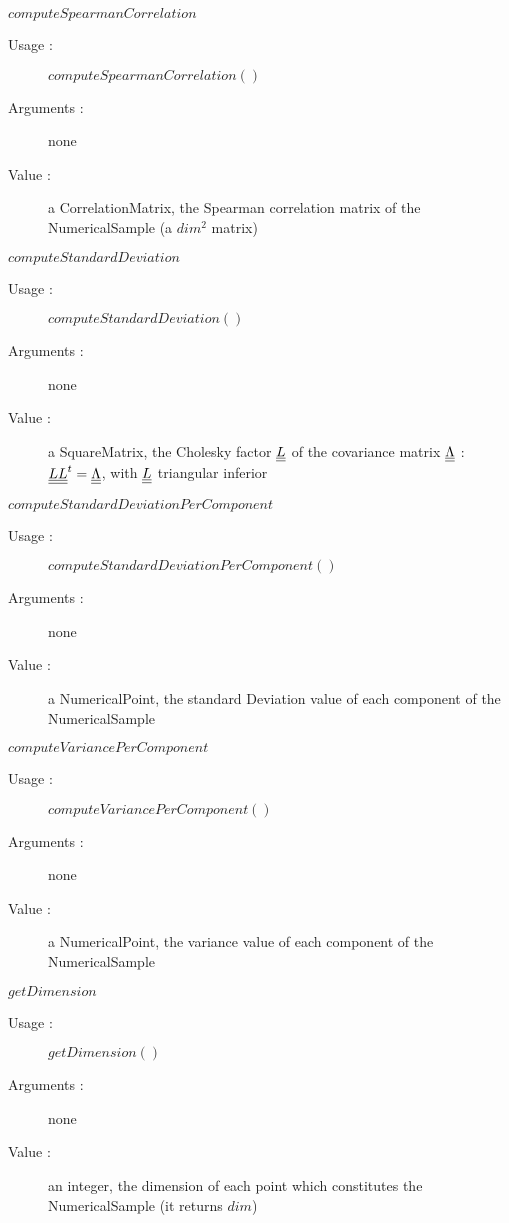 \begin{description}
\begin{description}
  \item $computeSpearmanCorrelation$
    \begin{description}
    \item[Usage :] $computeSpearmanCorrelation()$
    \item[Arguments :] none
    \item[Value :] a CorrelationMatrix, the Spearman correlation matrix of the NumericalSample (a $dim^2$ matrix)
    \end{description}
    \bigskip

  \item $computeStandardDeviation$
    \begin{description}
    \item[Usage :] $computeStandardDeviation()$
    \item[Arguments :] none
    \item[Value :] a SquareMatrix, the Cholesky factor ${\underline{\underline{L}}}$ of the  covariance matrix ${\underline{\underline{\Lambda}}}$ : ${\underline{\underline{L}}}{\underline{\underline{L}}}^t = {\underline{\underline{\Lambda}}}$, with ${\underline{\underline{L}}}$ triangular inferior
    \end{description}
    \bigskip

  \item $computeStandardDeviationPerComponent$
    \begin{description}
    \item[Usage :] $computeStandardDeviationPerComponent()$
    \item[Arguments :] none
    \item[Value :] a NumericalPoint, the standard Deviation value of each component of the NumericalSample
    \end{description}
    \bigskip

  \item $computeVariancePerComponent$
    \begin{description}
    \item[Usage :] $computeVariancePerComponent()$
    \item[Arguments :] none
    \item[Value :] a NumericalPoint, the variance value of each component of the NumericalSample
    \end{description}
    \bigskip

  \item $getDimension$
    \begin{description}
    \item[Usage :] $getDimension()$
    \item[Arguments :] none
    \item[Value :] an integer, the dimension of each point which constitutes the NumericalSample (it returns $dim$)
    \end{description}
    \bigskip


\end{description}
\end{description}
